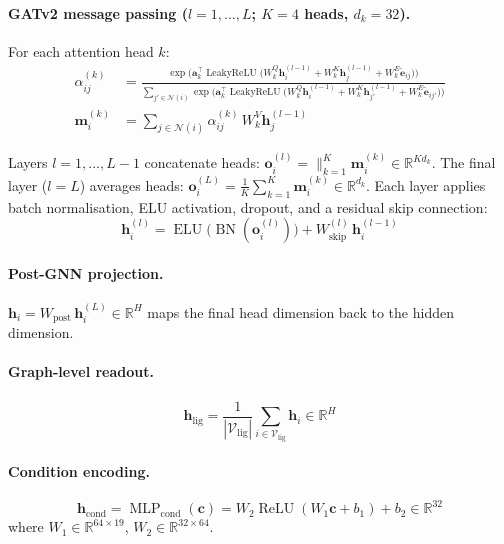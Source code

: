 \documentclass[11pt]{article}
\begin{document}
\paragraph{GATv2 message passing ($l = 1, \ldots, L$; $K = 4$ heads, $d_k = 32$).}
For each attention head $k$:
\begin{align}
  \alpha_{ij}^{(k)} &= \frac{
    \exp\!\bigl(\mathbf{a}_k^\top
      \operatorname{LeakyReLU}\!\bigl(
        W_k^Q \mathbf{h}_i^{(l-1)} + W_k^K \mathbf{h}_j^{(l-1)}
        + W_k^E \tilde{\mathbf{e}}_{ij}
      \bigr)\bigr)
  }{
    \sum_{j' \in \mathcal{N}(i)}
    \exp\!\bigl(\mathbf{a}_k^\top
      \operatorname{LeakyReLU}\!\bigl(
        W_k^Q \mathbf{h}_i^{(l-1)} + W_k^K \mathbf{h}_{j'}^{(l-1)}
        + W_k^E \tilde{\mathbf{e}}_{ij'}
      \bigr)\bigr)
  } \label{eq:gatv2_attn} \\[4pt]
  \mathbf{m}_i^{(k)} &= \sum_{j \in \mathcal{N}(i)}
    \alpha_{ij}^{(k)}\, W_k^V \mathbf{h}_j^{(l-1)}
    \label{eq:gatv2_msg}
\end{align}

\noindent
Layers $l = 1, \ldots, L{-}1$ concatenate heads:
$\mathbf{o}_i^{(l)} = \|_{k=1}^{K} \mathbf{m}_i^{(k)} \in \mathbb{R}^{Kd_k}$.
The final layer ($l = L$) averages heads:
$\mathbf{o}_i^{(L)} = \tfrac{1}{K}\sum_{k=1}^{K} \mathbf{m}_i^{(k)} \in \mathbb{R}^{d_k}$.
Each layer applies batch normalisation, ELU activation, dropout, and a
residual skip connection:
\begin{equation}
  \mathbf{h}_i^{(l)} = \operatorname{ELU}\!\bigl(
    \operatorname{BN}(\mathbf{o}_i^{(l)})
  \bigr) + W_{\mathrm{skip}}^{(l)}\, \mathbf{h}_i^{(l-1)}
  \label{eq:gatv2_residual}
\end{equation}

\paragraph{Post-GNN projection.}
$\mathbf{h}_i = W_{\mathrm{post}}\, \mathbf{h}_i^{(L)} \in \mathbb{R}^{H}$
maps the final head dimension back to the hidden dimension.

\paragraph{Graph-level readout.}
$$\mathbf{h}_{\mathrm{lig}} = \frac{1}{|\mathcal{V}_{\mathrm{lig}}|}
  \sum_{i \in \mathcal{V}_{\mathrm{lig}}} \mathbf{h}_i
  \in \mathbb{R}^{H}$$

\paragraph{Condition encoding.}
\begin{equation}
  \mathbf{h}_{\mathrm{cond}} = \operatorname{MLP}_{\mathrm{cond}}(\mathbf{c})
  = W_2 \operatorname{ReLU}(W_1 \mathbf{c} + b_1) + b_2
  \in \mathbb{R}^{32}
  \label{eq:cond_enc}
\end{equation}
where $W_1 \in \mathbb{R}^{64 \times 19}$, $W_2 \in \mathbb{R}^{32 \times 64}$.
\end{document}
